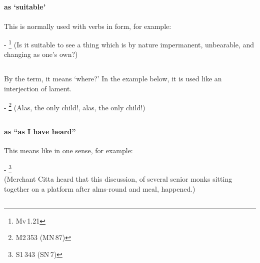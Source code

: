\subsection*{}\label{nip:kalladm}
\paragraph*{ as `suitable'} This is normally used with verbs in  form, for example:\par
- \footnote{Mv\,1.21} (Is it suitable to see a thing which is by nature impermanent, unbearable, and changing as one's own?) \par

\subsection*{}\label{nip:kahadm}
By the term, it means `where?' In the example below, it is used like an interjection of lament.\par
- \footnote{M2\,353 (MN\,87)} (Alas, the only child!, alas, the only child!) \par

\subsection*{}\label{nip:kira}
\paragraph*{ as ``as I have heard''} This means like  in one sense, for example:\par
- \footnote{S1\,343 (SN\,7)} \\(Merchant Citta heard that this discussion, of several senior monks sitting together on a platform after alms-round and meal, happened.) \par

\subsection*{}\label{nip:kkhattudm}

